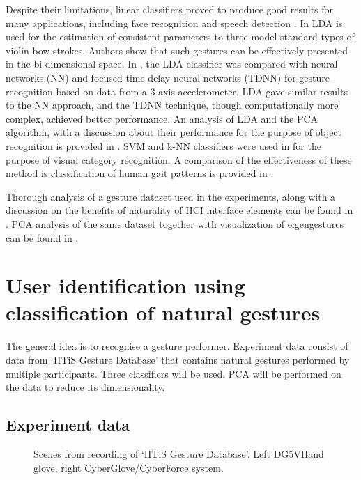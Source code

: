\documentclass[]{article}
\begin{document}
Despite their limitations, linear classifiers \cite{Koronacki:2005} proved to
produce good results for many applications, including face recognition
\cite{Wang:2004} and speech detection \cite{Martin:2001}. In
\cite{Rasamimanana:2006} LDA is used for the estimation of consistent
parameters to three model standard types of violin bow strokes. Authors show
that such gestures can be effectively presented in the bi-dimensional space.  In
\cite{Moiz:2011}, the LDA classifier was compared with neural networks (NN)
and focused time delay neural networks (TDNN) for gesture recognition based on
data from a 3-axis accelerometer. LDA gave similar results to the NN approach,
and the TDNN technique, though computationally more complex, achieved better
performance. An analysis of LDA and the PCA algorithm, with a discussion about
their performance for the purpose of object recognition is provided in
\cite{Martinez:2001}. SVM and k-NN classifiers were used in
\cite{Zhang:2006} for the purpose of visual category recognition. A
comparison of the effectiveness of these method is classification of human gait
patterns is provided in \cite{Sudha:2012}.

Thorough analysis of a gesture dataset used in the experiments, along with a
discussion on the benefits of naturality of HCI interface elements can be found
in \cite{Glomb:2012}. PCA analysis of the same dataset together with
visualization of eigengestures can be found in \cite{GawronEtAll:2011}.

\section{User identification using classification of natural gestures}
The general idea is to recognise a gesture performer. Experiment data consist of
data from `IITiS Gesture Database' that contains natural gestures performed by
multiple participants. Three classifiers will be used. PCA will be performed on
the data to reduce its dimensionality.

\subsection{Experiment data}

\begin{figure}[h]
 \centering
{}
  \caption{Scenes from recording of `IITiS Gesture Database'. Left DG5VHand glove, right CyberGlove/CyberForce system.}
  \label{fig:gestures_intro}
\end{figure}
\end{document}
